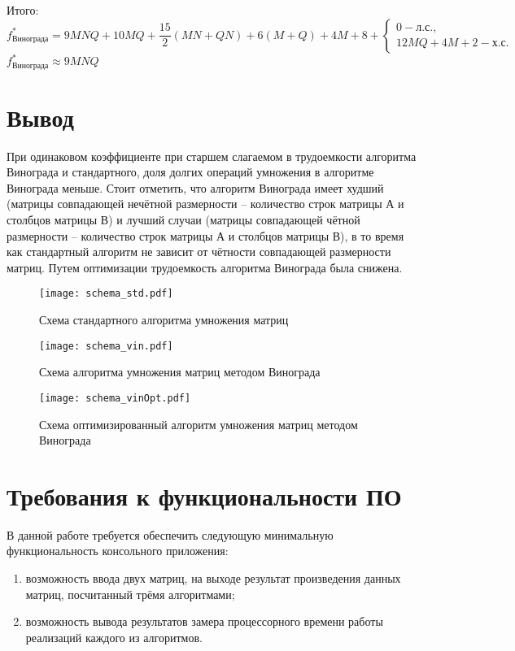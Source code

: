             Итого:
            \begin{equation}
                f_\text{Винограда}^* = 9MNQ + 10MQ + \frac{15}{2}(MN + QN) + 6(M + Q) + 4M + 8 + 
                    \left\{ \begin{matrix}
                    0 - \text{л.с.},\\
                    12MQ + 4M + 2 - \text{х.с.} 
                    \end{matrix}\right.
            \end{equation}
            $ f_\text{Винограда}^* \approx 9MNQ $

    \section{Вывод}
       При одинаковом коэффициенте при старшем слагаемом в трудоемкости алгоритма Винограда и стандартного, доля долгих операций умножения в алгоритме Винограда меньше.
        Стоит отметить, что алгоритм Винограда имеет худший (матрицы совпадающей нечётной размерности -- количество строк матрицы А и столбцов матрицы В) и лучший случаи (матрицы совпадающей чётной размерности -- количество строк матрицы А и столбцов матрицы В),
        в то время как стандартный алгоритм не зависит от чётности совпадающей размерности матриц. Путем оптимизации трудоемкость алгоритма Винограда была снижена.


    \begin{figure}[h!]
        \centering
            \texttt{[image: schema\_std.pdf]}
            \caption{Схема стандартного алгоритма умножения матриц}
            \label{schema:standartDot}
    \end{figure}

    \begin{figure}[h!]
        \centering
            \texttt{[image: schema\_vin.pdf]}
            \caption{Схема алгоритма умножения матриц методом Винограда}
            \label{schema:vinogradDot}
    \end{figure}

    \begin{figure}[h!]
        \centering
            \texttt{[image: schema\_vinOpt.pdf]}
            \caption{Схема оптимизированный алгоритм умножения матриц методом Винограда}
            \label{schema:vinogradDot:optimize}
    \end{figure}

    \section{Требования к функциональности ПО}
        В данной работе требуется обеспечить следующую минимальную функциональность консольного приложения:
        \begin{enumerate}
            \item возможность ввода двух матриц, на выходе результат произведения данных матриц, посчитанный трёмя алгоритмами;
            \item возможность вывода результатов замера процессорного времени работы реализаций каждого из алгоритмов. 
        \end{enumerate}

